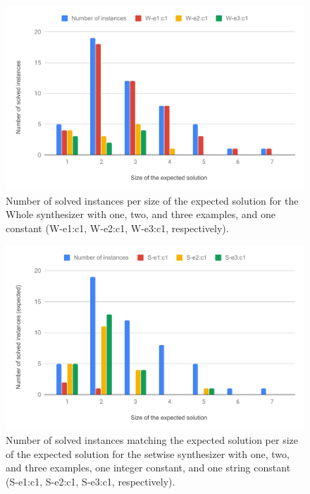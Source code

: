 \begin{figure}
  \centering
  \includegraphics[width=1.0\textwidth]{assets/bar-chart-solved-whole.pdf}
  \caption{Number of solved instances per size of the expected solution for
    the Whole synthesizer with one, two, and three examples, and one constant
    (W-e1:c1, W-e2:c1, W-e3:c1, respectively).}
  \label{fig:bar-chart-solved-whole}
\end{figure}

\begin{figure}
  \centering
  \includegraphics[width=1.0\textwidth]{assets/bar-chart-expected-setwise.pdf}
  \caption{Number of solved instances matching the expected solution per size of
    the expected solution for the setwise synthesizer with one, two, and three
    examples, one integer constant, and one string constant (S-e1:c1, S-e2:c1,
    S-e3:c1, respectively).}
  \label{fig:bar-chart-expected-setwise}
\end{figure}

